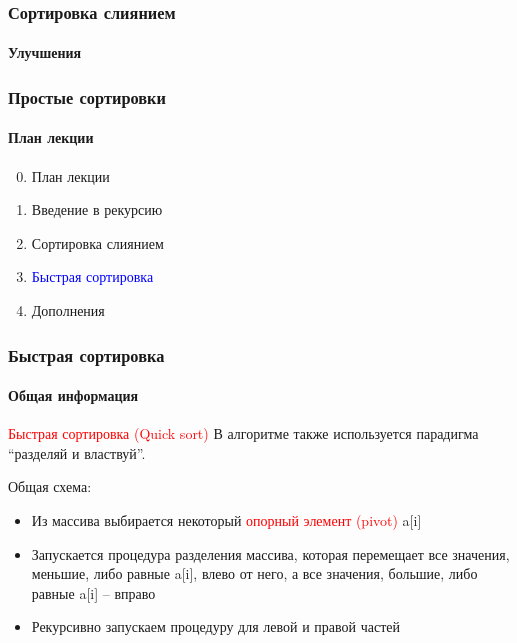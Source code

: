 \documentclass[aspectratio=169]{beamer}
\begin{document}
\begin{frame}
\frametitle{Сортировка слиянием}
\framesubtitle{Улучшения}
\justifying
\begin{figure}
    \captionsetup[subfigure]{labelformat=empty}
    \centering
\end{figure}
\end{frame}

\begin{frame}
\frametitle{Простые сортировки}
\framesubtitle{План лекции}

\begin{enumerate}
  \setcounter{enumi}{-1}
  \item{План лекции}
  \item{Введение в рекурсию}
  \item{Сортировка слиянием}
  \item{\textcolor{blue}{Быстрая сортировка}}
  \item{Дополнения}
\end{enumerate}
\end{frame}

\begin{frame}
\frametitle{Быстрая сортировка}
\framesubtitle{Общая информация}
\justifying
\textcolor{red}{Быстрая сортировка (Quick sort)}\newline\newline
В алгоритме также используется парадигма “разделяй и властвуй”.\newline

Общая схема:

\begin{itemize}
\item{Из массива выбирается некоторый \textcolor{red}{опорный элемент (pivot)} a[i] }
\item{Запускается процедура разделения массива, которая перемещает все значения, меньшие, либо равные a[i], влево от него, а все значения, большие, либо равные a[i] – вправо}
\item{Рекурсивно запускаем процедуру для левой и правой частей}
\end{itemize}

\end{frame}
\end{document}
